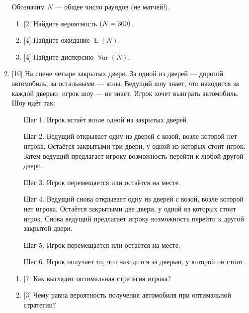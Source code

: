 \documentclass[12pt]{article}
\DeclareMathOperator{\Var}{\mathbb{V}ar}
\let\P\relax
\DeclareMathOperator{\P}{\mathbb{P}}
\DeclareMathOperator{\E}{\mathbb{E}}
\begin{document}
\begin{enumerate}
    Обозначим $N$ — общее число раундов (не матчей!). 

    \begin{enumerate}
        \item {[2]} Найдите вероятность $\P(N = 300)$.
        \item {[4]} Найдите ожидание $\E(N)$.
        \item {[4]} Найдите дисперсию $\Var(N)$.
    \end{enumerate}
    

    \item {[10]} На сцене четыре закрытых двери. 
    За одной из дверей — дорогой автомобиль, за остальными — козы. 
    Ведущий шоу знает, что находится за каждой дверью, игрок шоу — не знает.
    Игрок хочет выиграть автомобиль. 
    Шоу идёт так:

    \begin{enumerate}
        \item[Шаг 1.] Игрок встаёт возле одной из закрытых дверей.
        
        \item[Шаг 2.] Ведущий открывает одну из дверей с козой, возле которой нет игрока.
        Остаётся закрытыми три двери, у одной из которых стоит игрок. 
        Затем ведущий предлагает игроку возможность перейти к любой другой двери.

        \item[Шаг 3.] Игрок перемещается или остаётся на месте.

        \item[Шаг 4.] Ведущий снова открывает одну из дверей с козой, возле которой нет игрока.
        Остаётся закрытыми две двери, у одной из которых стоит игрок.
        Снова ведущий предлагает игроку возможность перейти к другой закрытой двери.

        \item[Шаг 5.] Игрок перемещается или остаётся на месте.    
        \item[Шаг 6.] Игрок получает то, что находится за дверью, у которой он стоит.
    \end{enumerate}
    
    \begin{enumerate}
        \item {[7]} Как выглядит оптимальная стратегия игрока?
        \item {[3]} Чему равна вероятность получения автомобиля при оптимальной стратегии?
    \end{enumerate}
    


\end{enumerate}
\end{document}
